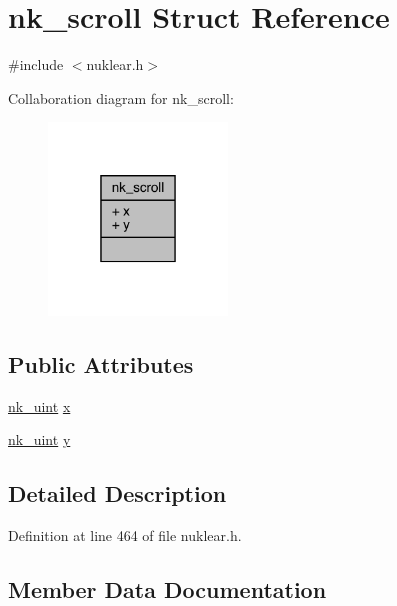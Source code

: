 \hypertarget{structnk__scroll}{}\section{nk\+\_\+scroll Struct Reference}
\label{structnk__scroll}


{\ttfamily \#include $<$nuklear.\+h$>$}



Collaboration diagram for nk\+\_\+scroll\+:
\nopagebreak
\begin{figure}[H]
\begin{center}
\leavevmode
\includegraphics[width=135pt]{structnk__scroll__coll__graph}
\end{center}
\end{figure}
\subsection*{Public Attributes}
\begin{DoxyCompactItemize}
\item 
\mbox{\hyperlink{nuklear_8h_a951b598a3101b6d2a55d22ac39f57919}{nk\+\_\+uint}} \mbox{\hyperlink{structnk__scroll_a6aa7dbdff410aadfde55e7514aca101d}{x}}
\item 
\mbox{\hyperlink{nuklear_8h_a951b598a3101b6d2a55d22ac39f57919}{nk\+\_\+uint}} \mbox{\hyperlink{structnk__scroll_a44fba8e9fb1e206f240e20257aad50b7}{y}}
\end{DoxyCompactItemize}


\subsection{Detailed Description}


Definition at line 464 of file nuklear.\+h.



\subsection{Member Data Documentation}
\mbox{\label{structnk__scroll_a6aa7dbdff410aadfde55e7514aca101d}} 
